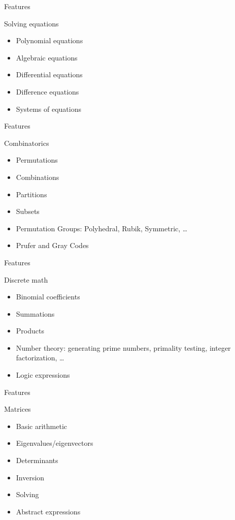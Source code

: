 \documentclass[xcolor=svgnames]{beamer}
\begin{document}
\begin{frame}{Features}
  \begin{block}{Solving equations}
    \begin{itemize}
    \item Polynomial equations
    \item Algebraic equations
    \item Differential equations
    \item Difference equations
    \item Systems of equations
    \end{itemize}
  \end{block}
\end{frame}

\begin{frame}{Features}
  \begin{block}{Combinatorics}
    \begin{itemize}
    \item Permutations
    \item Combinations
    \item Partitions
    \item Subsets
    \item Permutation Groups: Polyhedral, Rubik, Symmetric, \ldots
    \item Prufer and Gray Codes
    \end{itemize}
  \end{block}
\end{frame}

\begin{frame}{Features}
  \begin{block}{Discrete math}
    \begin{itemize}
    \item Binomial coefficients
    \item Summations
    \item Products
    \item Number theory: generating prime numbers, primality testing, integer
      factorization, \ldots
    \item Logic expressions
    \end{itemize}
  \end{block}
\end{frame}

\begin{frame}{Features}
  \begin{block}{Matrices}
    \begin{itemize}
    \item Basic arithmetic
    \item Eigenvalues/eigenvectors
    \item Determinants
    \item Inversion
    \item Solving
    \item Abstract expressions
    \end{itemize}
  \end{block}
\end{frame}
\end{document}
